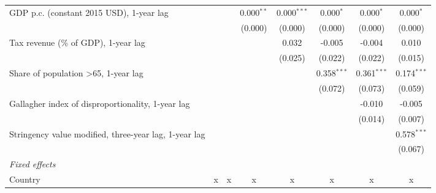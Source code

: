\begin{table}[htbp]
\begin{tabular}{lccccccc}
      GDP p.c. (constant 2015 USD), 1-year lag                                                    &         &         & 0.000$^{**}$ & 0.000$^{***}$ & 0.000$^{*}$   & 0.000$^{*}$   & 0.000$^{*}$\\   
                                                                                                  &         &         & (0.000)      & (0.000)       & (0.000)       & (0.000)       & (0.000)\\   
      Tax revenue (\% of GDP), 1-year lag                                                         &         &         &              & 0.032         & -0.005        & -0.004        & 0.010\\   
                                                                                                  &         &         &              & (0.025)       & (0.022)       & (0.022)       & (0.015)\\   
      Share of population >65, 1-year lag                                                         &         &         &              &               & 0.358$^{***}$ & 0.361$^{***}$ & 0.174$^{***}$\\   
                                                                                                  &         &         &              &               & (0.072)       & (0.073)       & (0.059)\\   
      Gallagher index of disproportionality, 1-year lag                                           &         &         &              &               &               & -0.010        & -0.005\\   
                                                                                                  &         &         &              &               &               & (0.014)       & (0.007)\\   
      Stringency value modified, three-year lag, 1-year lag                                       &         &         &              &               &               &               & 0.578$^{***}$\\   
                                                                                                  &         &         &              &               &               &               & (0.067)\\   
      \emph{Fixed effects}\\
      Country                                                                                     & x       & x       & x            & x             & x             & x             & x\\  

\end{tabular}
\end{table}
